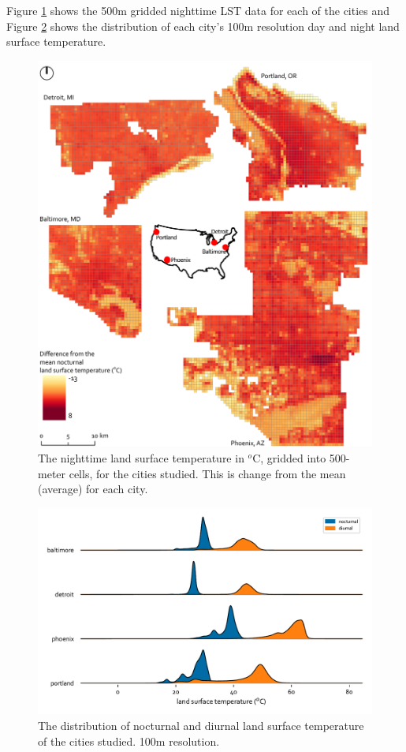 \documentclass[review]{elsarticle}
\begin{document}
Figure \ref{fig:map} shows the 500m gridded nighttime LST data for each of the cities and Figure \ref{fig:joy} shows the distribution of each city's 100m resolution day and night land surface temperature. 

\begin{figure}
    \centering
    \includegraphics[width=\textwidth]{fig/report/map_nocturnal_lst.pdf}
    \caption[The nighttime land surface temperature in $^o$C, gridded into 500-meter cells, for the cities studied]{The nighttime land surface temperature in $^o$C, gridded into 500-meter cells, for the cities studied. This is change from the mean (average) for each city.}
    \label{fig:map}
\end{figure}


\begin{figure}
    \centering
    \includegraphics[width=\linewidth]{fig/report/joyplot_lst_100.pdf}
    \caption{The distribution of nocturnal and diurnal land surface temperature of the cities studied. 100m resolution.}
    \label{fig:joy}
\end{figure}
\end{document}
